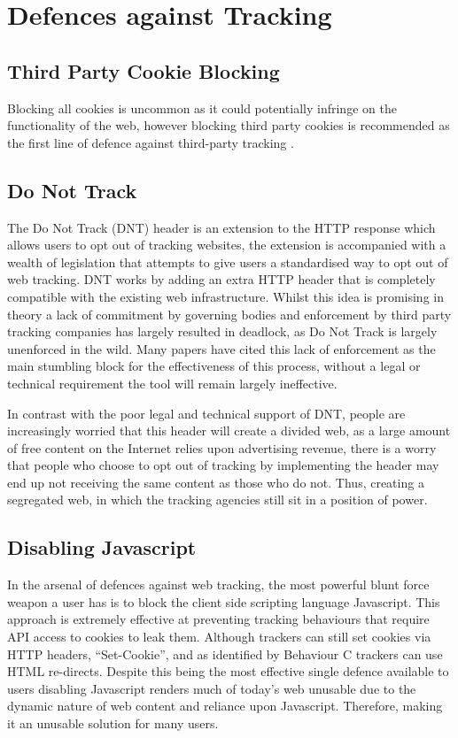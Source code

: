 \documentclass[12pt]{article}
\begin{document}
\section{Defences against Tracking}
\subsection{Third Party Cookie Blocking}
Blocking all cookies is uncommon as it could potentially infringe on the functionality of the web, however blocking third party cookies is recommended as the first line of defence against third-party tracking \parencite{roesner}. 

\subsection{Do Not Track}
The Do Not Track (DNT) header is an extension to the HTTP response which allows users to opt out of tracking websites, the extension is accompanied with a wealth of legislation that attempts to give users a standardised way to opt out of web tracking. DNT works by adding an extra HTTP header that is completely compatible with the existing web infrastructure. Whilst this idea is promising in theory a lack of commitment by governing bodies and enforcement by third party tracking companies has largely resulted in deadlock, as Do Not Track is largely unenforced in the wild. Many papers have cited this lack of enforcement as the main stumbling block for the effectiveness of this process, without a legal or technical requirement the tool will remain largely ineffective. \newline

In contrast with the poor legal and technical support of DNT, people are increasingly worried that this header will create a divided web, as a large amount of free content on the Internet relies upon advertising revenue, there is a worry that people who choose to opt out of tracking by implementing the header may end up not receiving the same content as those who do not. Thus, creating a segregated web, in which the tracking agencies still sit in a position of power. 

\subsection{Disabling Javascript}
In the arsenal of defences against web tracking, the most powerful blunt force weapon a user has is to block the client side scripting language Javascript. This approach is extremely effective at preventing tracking behaviours that require API access to cookies to leak them. Although trackers can still set cookies via HTTP headers, ``Set-Cookie'', and as identified by \parencite{roesner} Behaviour C trackers can use HTML re-directs. Despite this being the most effective single defence available to users disabling Javascript renders much of today's web unusable due to the dynamic nature of web content and reliance upon Javascript. Therefore, making it an unusable solution for many users. 
\end{document}
